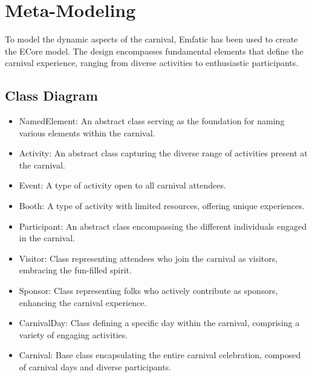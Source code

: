 \documentclass[a4paper,11pt]{report}
\begin{document}
\section{Meta-Modeling}

To model the dynamic aspects of the carnival, Emfatic has been used to create the ECore model. The design encompasses fundamental elements that define the carnival experience, ranging from diverse activities to enthusiastic participants.

\subsection{Class Diagram}

\begin{itemize}
	\item NamedElement: An abstract class serving as the foundation for naming various elements within the carnival.
	\item Activity: An abstract class capturing the diverse range of activities present at the carnival.
	\item Event: A type of activity open to all carnival attendees.
	\item Booth: A type of activity with limited resources, offering unique experiences.
	\item Participant: An abstract class encompassing the different individuals engaged in the carnival.
	\item Visitor: Class representing attendees who join the carnival as visitors, embracing the fun-filled spirit.
	\item Sponsor: Class representing folks who actively contribute as sponsors, enhancing the carnival experience.
	\item CarnivalDay: Class defining a specific day within the carnival, comprising a variety of engaging activities.
	\item Carnival: Base class encapsulating the entire carnival celebration, composed of carnival days and diverse participants.
\end{itemize}
\end{document}
